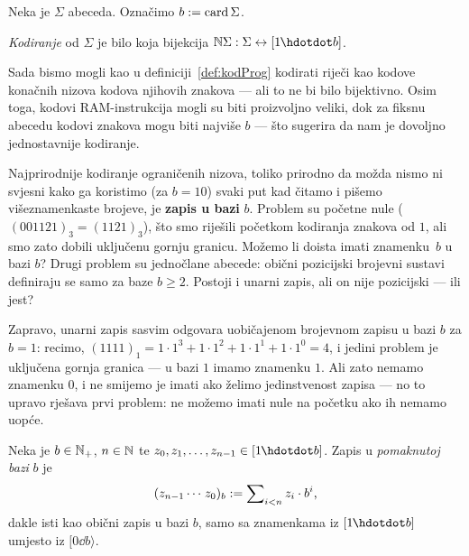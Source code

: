 \begin{definicija}[{name=[kodiranje abecede]}]
Neka je $\Sigma$ abeceda. Označimo $b:=\operatorname{card}\Sigma$. %

	\emph{Kodiranje} od $\Sigma$ je bilo koja bijekcija $\N\Sigma:\Sigma\leftrightarrow[1\mspace{-1mu}\dd b]$.
\end{definicija}


Sada bismo mogli kao u definiciji~\ref{def:kodProg} kodirati riječi kao kodove konačnih nizova kodova njihovih znakova --- ali to ne bi bilo bijektivno. Osim toga, kodovi RAM-instrukcija mogli su biti proizvoljno veliki, dok za fiksnu abecedu kodovi znakova mogu biti najviše $b$ --- što sugerira da nam je dovoljno jednostavnije kodiranje.

Najprirodnije kodiranje ograničenih nizova, toliko prirodno da možda nismo ni svjesni kako ga koristimo (za $b=10$) svaki put kad čitamo i pišemo višeznamenkaste brojeve, je \textbf{zapis u bazi} $b$. Problem su početne nule ($\mspace{1mu}(001121)_3=(1121)_3$), što smo riješili početkom kodiranja znakova od $1$, ali smo zato dobili uključenu gornju granicu. Možemo li doista imati zna\-men\-ku~$b$ u bazi $b$? Drugi problem su jednočlane abecede: obični pozicijski brojevni sustavi definiraju se samo za baze $b\ge2$. Postoji i unarni zapis, ali on nije pozicijski --- ili jest?

Zapravo, unarni zapis sasvim odgovara uobičajenom brojevnom zapisu u bazi $b$ za $b=1$: recimo, $(1111)_1=1\cdot1^3+1\cdot1^2+1\cdot1^1+1\cdot1^0=4$, i jedini problem je uključena gornja granica --- u bazi $1$ imamo znamenku $1$. Ali zato nemamo znamenku $0$, i ne smijemo je imati ako želimo jedinstvenost zapisa --- no to upravo rješava prvi problem: ne možemo imati nule na početku ako ih nemamo uopće.

\begin{definicija}[{name=[zapis broja u pomaknutoj bazi]}]
	Neka je $b\in{\mathbb N}_+$, $n\in{\mathbb N}$ te $z_0,z_1,\dotsc,z_{n-1}\in[1\mspace{-1mu}\dd b]$. Zapis u \emph{pomaknutoj bazi} $b$ je %
\begin{equation}\label{eq:pomakbaza}
	(z_{n-1}\dotsm\mspace{2mu} z_0)_b:=\sum\nolimits_{i<n}z_i\cdot b^i\text,
\end{equation}
	dakle isti kao obični zapis u bazi $b$, samo sa znamenkama iz $[1\mspace{-1mu}\dd b]$ umjesto iz $[0\dd b\rangle$.
\end{definicija}

